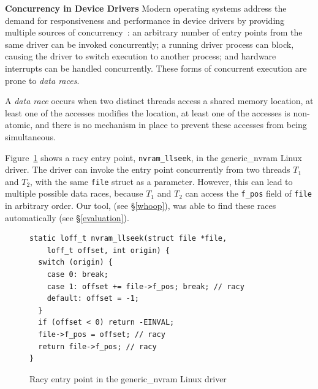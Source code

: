 \noindent\textbf{Concurrency in Device Drivers }
%
Modern operating systems address the demand for responsiveness and performance in device drivers by providing multiple sources of concurrency~\cite{corbet2005linux}: an arbitrary number of entry points from the same driver can be invoked concurrently; a running driver process can block, causing the driver to switch execution to another process; and hardware interrupts can be handled concurrently.  These forms of concurrent execution are prone to \emph{data races}.

\begin{definition}
\label{definition:datarace}
A \emph{data race} occurs when two distinct threads access a shared memory location, at least one of the accesses modifies the location, at least one of the accesses is non-atomic, and there is no mechanism in place to prevent these accesses from being simultaneous.
\end{definition}

Figure~\ref{fig:data_race_example} shows a racy entry point, \texttt{nvram\_llseek}, in the generic\_nvram Linux driver. The driver can invoke the entry point concurrently from two threads $T_1$ and $T_2$, with the same \texttt{file} struct as a parameter. However, this can lead to multiple possible data races, because $T_1$ and $T_2$ can access the \texttt{f\_pos} field of \texttt{file} in arbitrary order. Our tool, \whoop (see \S\ref{whoop}), was able to find these races automatically (see \S\ref{evaluation}).

\begin{figure}[t]
\begin{lstlisting}
static loff_t nvram_llseek(struct file *file,
    loff_t offset, int origin) {
  switch (origin) {
    case 0: break;
    case 1: offset += file->f_pos; break; // racy
    default: offset = -1;
  }
  if (offset < 0) return -EINVAL;
  file->f_pos = offset; // racy
  return file->f_pos; // racy
}
\end{lstlisting}
\vspace{-2mm}
\caption{Racy entry point in the generic\_nvram Linux driver}
\label{fig:data_race_example}
\vspace{-2mm}
\end{figure}

